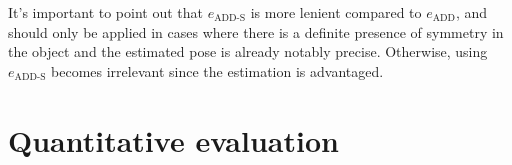 It's important to point out that $e_{\mathrm{ADD}\text{-}\mathrm{S}}$ is more lenient compared to $e_\mathrm{ADD}$, and should only be applied in cases where there is a definite presence of symmetry in the object and the estimated pose is already notably precise. Otherwise, using $e_{\mathrm{ADD}\text{-}\mathrm{S}}$ becomes irrelevant since the estimation is advantaged.

\section{Quantitative evaluation}

